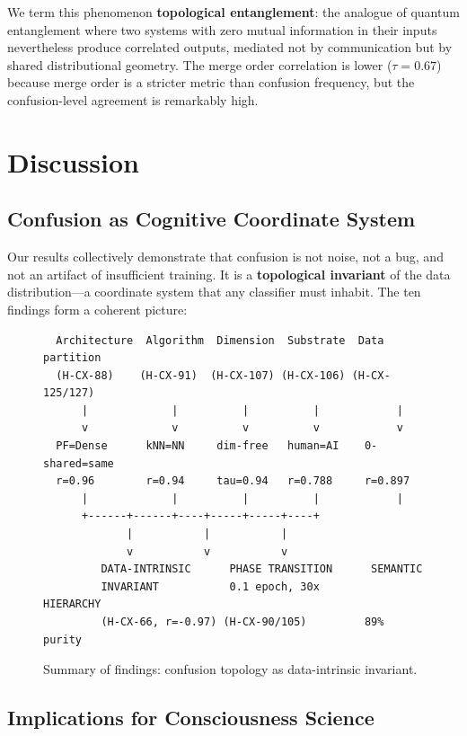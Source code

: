 \documentclass[11pt,a4paper]{article}
\begin{document}
We term this phenomenon \textbf{topological entanglement}: the analogue of quantum entanglement where two systems with zero mutual information in their inputs nevertheless produce correlated outputs, mediated not by communication but by shared distributional geometry. The merge order correlation is lower ($\tau = 0.67$) because merge order is a stricter metric than confusion frequency, but the confusion-level agreement is remarkably high.

\section{Discussion}
\label{sec:discussion}

\subsection{Confusion as Cognitive Coordinate System}

Our results collectively demonstrate that confusion is not noise, not a bug, and not an artifact of insufficient training. It is a \textbf{topological invariant} of the data distribution---a coordinate system that any classifier must inhabit. The ten findings form a coherent picture:

\begin{figure}[htbp]
\centering
\begin{verbatim}
  Architecture  Algorithm  Dimension  Substrate  Data partition
  (H-CX-88)    (H-CX-91)  (H-CX-107) (H-CX-106) (H-CX-125/127)
      |             |          |          |            |
      v             v          v          v            v
  PF=Dense      kNN=NN     dim-free   human=AI    0-shared=same
  r=0.96        r=0.94     tau=0.94   r=0.788     r=0.897
      |             |          |          |            |
      +------+------+----+-----+-----+----+
             |           |           |
             v           v           v
         DATA-INTRINSIC      PHASE TRANSITION      SEMANTIC
         INVARIANT           0.1 epoch, 30x        HIERARCHY
         (H-CX-66, r=-0.97) (H-CX-90/105)         89% purity
\end{verbatim}
\caption{Summary of findings: confusion topology as data-intrinsic invariant.}
\label{fig:summary}
\end{figure}

\subsection{Implications for Consciousness Science}
\end{document}
